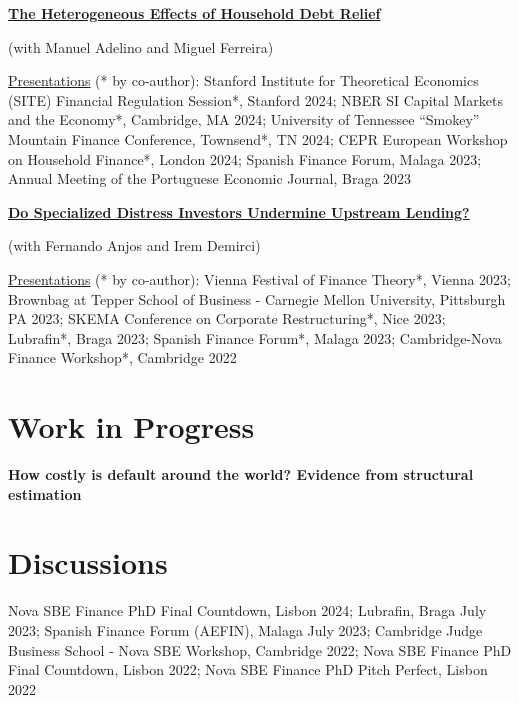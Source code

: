 \documentclass[letterpaper]{article}
\newenvironment{itemize*}{
  \begin{list}{}{
    \setlength{\leftmargin}{1.5em}
  }
}{
  \end{list}
}
\begin{document}
\begin{itemize*}
\item \href{https://papers.ssrn.com/sol3/papers.cfm?abstract_id=4784540}{\color{blue}\textbf{The Heterogeneous Effects of Household Debt Relief}}

	(with Manuel Adelino and Miguel Ferreira)
	
	\underline{Presentations} (* by co-author): Stanford Institute for Theoretical Economics (SITE) Financial Regulation Session*, Stanford 2024; NBER SI Capital Markets and the Economy*, Cambridge, MA 2024; University of Tennessee ``Smokey'' Mountain Finance Conference, Townsend*, TN 2024; CEPR European Workshop on Household Finance*, London 2024; Spanish Finance Forum, Malaga 2023; Annual Meeting of the Portuguese Economic Journal, Braga 2023
\medskip
	
\item \href{https://papers.ssrn.com/sol3/papers.cfm?abstract_id=4395807}{\color{blue}\textbf{Do Specialized Distress Investors Undermine Upstream Lending?}}

	(with Fernando Anjos and Irem Demirci)

	\underline{Presentations} (* by co-author): Vienna Festival of Finance Theory*, Vienna 2023; Brownbag at Tepper School of Business - Carnegie Mellon University, Pittsburgh PA 2023; SKEMA Conference on Corporate Restructuring*, Nice 2023; Lubrafin*, Braga 2023; Spanish Finance Forum*, Malaga 2023; Cambridge-Nova Finance Workshop*, Cambridge 2022
\end{itemize*}

\section*{Work in Progress}
\vspace{-0.2in}
\hrulefill

\begin{itemize*}
\item \textbf{How costly is default around the world? Evidence from structural estimation}
\end{itemize*}

\section*{Discussions}
\vspace{-0.2in}
\hrulefill
\begin{itemize*}
\item Nova SBE Finance PhD Final Countdown, Lisbon 2024; Lubrafin, Braga July 2023; Spanish Finance Forum (AEFIN), Malaga July 2023; Cambridge Judge Business School - Nova SBE Workshop,  Cambridge 2022; Nova SBE Finance PhD Final Countdown, Lisbon 2022; Nova SBE Finance PhD Pitch Perfect, Lisbon 2022
\end{itemize*}
\end{document}
